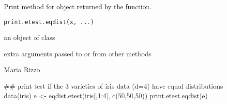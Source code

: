 \documentclass{article}
\begin{document}
\begin{Description}\relax
Print method for  object returned by the 
 function.
\end{Description}
\begin{Usage}
\begin{verbatim}
print.etest.eqdist(x, ...)
\end{verbatim}
\end{Usage}
\begin{Arguments}
\begin{ldescription}
\item[\code{x}] an object of class  
\item[\code{...}] extra arguments passed to or from other methods 
\end{ldescription}
\end{Arguments}
\begin{Author}\relax
Maria Rizzo 
\end{Author}
\begin{SeeAlso}\relax
{}
\end{SeeAlso}
\begin{Examples}
\begin{ExampleCode}
## print test if the 3 varieties of iris data (d=4) have equal distributions
 data(iris)
 e <- eqdist.etest(iris[,1:4], c(50,50,50))
 print.etest.eqdist(e)
 \end{ExampleCode}
\end{Examples}
\end{document}

